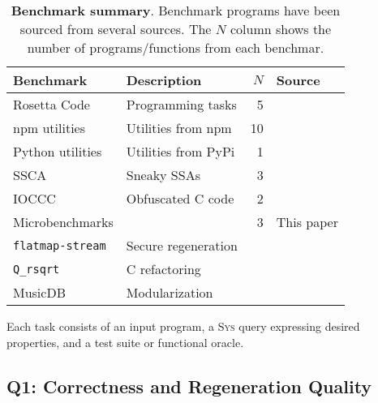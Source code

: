 \documentclass[sigplan]{acmart}
\newcommand{\sys}{{\scshape Sys}\xspace}
\newcommand{\ttt}[1]{\texttt{#1}}
\begin{document}
\begin{table}[h]
\centering
  \caption{\textbf{Benchmark summary}. 
  Benchmark programs have been sourced from several sources.
  The $N$ column shows the number of programs/functions from each benchmar.
  }
\begin{tabular}{llrl}
\toprule
Benchmark                                               & Description                    & $N$ & Source \\
\midrule
  Rosetta Code                                          & Programming tasks              & 5 & \cite{rosettacode} \\
  npm utilities                                           & Utilities from npm             & 10 & \cite{regbench2025} \\
Python utilities                                        & Utilities from PyPi            & 1 & \cite{regbench2025} \\
  SSCA                                                    & Sneaky SSAs    & 3 & \cite{ev:eurosec:2022, es1, ohm2020backstabber} \\
  IOCCC                                                   & Obfuscated C code              & 2 & \cite{ioccc} \\
Microbenchmarks                                         &          & 3    & This paper \\
  \hspace{.5em} \ttt{flatmap-stream}                      & Secure regeneration            &      & \cite{es1}  \\
  \hspace{.5em} \ttt{Q_rsqrt}                             & C refactoring        &      & \cite{fast_inv_sqrt}  \\
  \hspace{.5em} \textsf{MusicDB}                          & Modularization           &      & \cite{codewithsadeemusicplayer} \\
\bottomrule
\end{tabular}
\label{tab:benchmarks}
\end{table}

Each task consists of an input program, a \sys query expressing desired properties, and a test suite or functional oracle.

\subsection{Q1: Correctness and Regeneration Quality}
\end{document}
